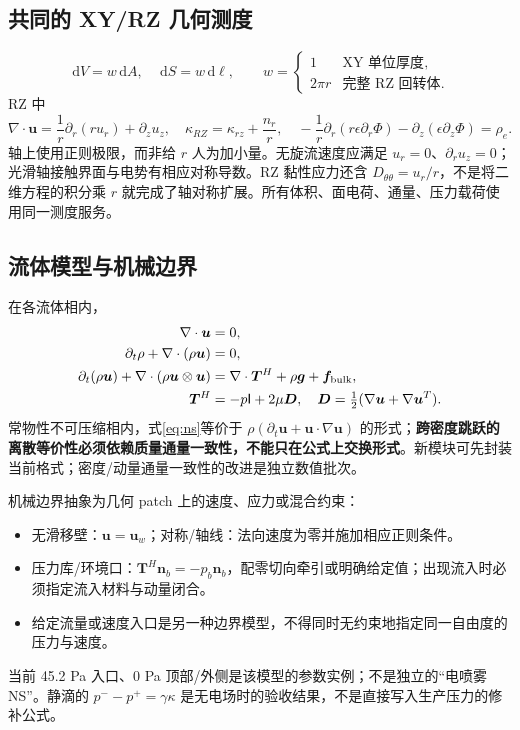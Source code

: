 \documentclass[UTF8,a4paper,11pt,fontset=fandol]{ctexart}
\numberwithin{equation}{section}
\newcommand{\dd}{\,\mathrm{d}}
\newcommand{\uu}{\bm u}
\newcommand{\nn}{\bm n}
\newcommand{\mat}[1]{\mathsf{#1}}
\begin{document}
\subsection{共同的 XY/RZ 几何测度}
\begin{equation}
 \dd V=w\dd A,\quad \dd S=w\dd\ell,\qquad
 w=\begin{cases}1&\text{XY 单位厚度},\\2\pi r&\text{完整 RZ 回转体}.
 \end{cases}
\end{equation}
RZ 中
\begin{equation}
 \nabla\cdot\uu=\frac1r\partial_r(ru_r)+\partial_z u_z,\quad
 \kappa_{RZ}=\kappa_{rz}+\frac{n_r}{r},\quad
 -\frac1r\partial_r(r\epsilon\partial_r\Phi)-\partial_z(\epsilon\partial_z\Phi)=\rho_e.
\end{equation}
轴上使用正则极限，而非给 $r$ 人为加小量。无旋流速度应满足 $u_r=0$、$\partial_r u_z=0$；光滑轴接触界面与电势有相应对称导数。RZ 黏性应力还含 $D_{\theta\theta}=u_r/r$，不是将二维方程的积分乘 $r$ 就完成了轴对称扩展。所有体积、面电荷、通量、压力载荷使用同一测度服务。

\subsection{流体模型与机械边界}\label{sec:flowmodel}
在各流体相内，
\begin{align}
 \nabla\cdot\uu&=0,\label{eq:div}\\
 \partial_t\rho+\nabla\cdot(\rho\uu)&=0,\label{eq:mass}\\
 \partial_t(\rho\uu)+\nabla\cdot(\rho\uu\otimes\uu)
 &=\nabla\cdot\bm T^H+\rho\bm g+\bm f_{\rm bulk},\label{eq:ns}\\
 \bm T^H&=-p\mat I+2\mu\bm D,\quad
 \bm D=\tfrac12(\nabla\uu+\nabla\uu^T).
\end{align}
常物性不可压缩相内，式\eqref{eq:ns}等价于 $\rho(\partial_t\uu+\uu\cdot\nabla\uu)$ 的形式；\textbf{跨密度跳跃的离散等价性必须依赖质量通量一致性，不能只在公式上交换形式}。新模块可先封装当前格式；密度/动量通量一致性的改进是独立数值批次。

机械边界抽象为几何 patch 上的速度、应力或混合约束：
\begin{itemize}
\item 无滑移壁：$\uu=\uu_w$；对称/轴线：法向速度为零并施加相应正则条件。
\item 压力库/环境口：$\bm T^H\nn_b=-p_b\nn_b$，配零切向牵引或明确给定值；出现流入时必须指定流入材料与动量闭合。
\item 给定流量或速度入口是另一种边界模型，不得同时无约束地指定同一自由度的压力与速度。
\end{itemize}
当前 45.2 Pa 入口、0 Pa 顶部/外侧是该模型的参数实例；不是独立的“电喷雾 NS”。静滴的 $p^--p^+=\gamma\kappa$ 是无电场时的验收结果，不是直接写入生产压力的修补公式。
\end{document}
